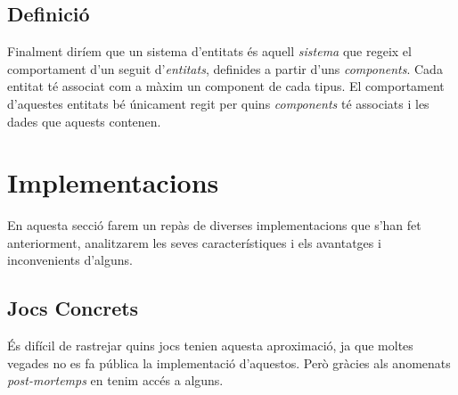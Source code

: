 \subsection{Definició}

Finalment diríem que un sistema d'entitats és aquell {\em sistema} que regeix el comportament d'un seguit d'{\em entitats}, definides a partir d'uns {\em components}. Cada entitat té associat com a màxim un component de cada tipus. El comportament d'aquestes entitats bé únicament regit per quins {\em components} té associats i les dades que aquests contenen.

\section{Implementacions}

En aquesta secció farem un repàs de diverses implementacions que s'han fet anteriorment, analitzarem les seves característiques i els avantatges i inconvenients d'alguns.

\subsection{Jocs Concrets}

És difícil de rastrejar quins jocs tenien aquesta aproximació, ja que moltes vegades no es fa pública la implementació d'aquestos. Però gràcies als anomenats {\em post-mortemps} en tenim accés a alguns.

